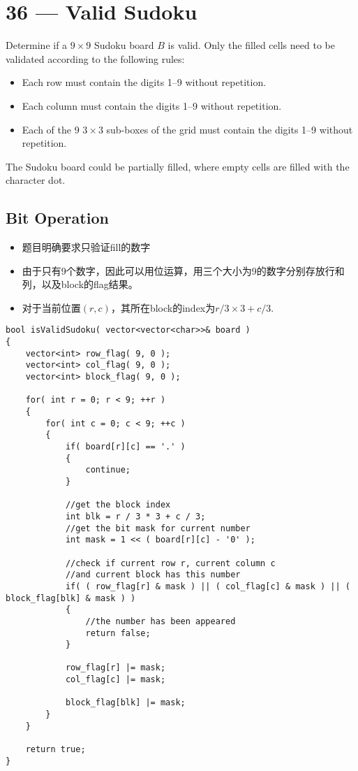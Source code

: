 \section{36 --- Valid Sudoku}
Determine if a $9\times 9$ Sudoku board $B$ is valid. Only the filled cells need to be validated according to the following rules:

\begin{itemize}
\item Each row must contain the digits 1--9 without repetition.
\item Each column must contain the digits 1--9 without repetition.
\item Each of the 9 $3\times 3$ sub-boxes of the grid must contain the digits 1--9 without repetition.
\end{itemize}

The Sudoku board could be partially filled, where empty cells are filled with the character dot.

\subsection{Bit Operation}
\begin{itemize}
\item 题目明确要求只验证fill的数字
\item 由于只有9个数字，因此可以用位运算，用三个大小为9的数字分别存放行和列，以及block的flag结果。
\item 对于当前位置$(r,c)$，其所在block的index为$r/3\times 3+c/3$.
\end{itemize}

\setcounter{lstlisting}{0}
\begin{lstlisting}[style=customc, caption={Bit Operation}]
bool isValidSudoku( vector<vector<char>>& board )
{
    vector<int> row_flag( 9, 0 );
    vector<int> col_flag( 9, 0 );
    vector<int> block_flag( 9, 0 );

    for( int r = 0; r < 9; ++r )
    {
        for( int c = 0; c < 9; ++c )
        {
            if( board[r][c] == '.' )
            {
                continue;
            }

            //get the block index
            int blk = r / 3 * 3 + c / 3;
            //get the bit mask for current number
            int mask = 1 << ( board[r][c] - '0' );

            //check if current row r, current column c
            //and current block has this number
            if( ( row_flag[r] & mask ) || ( col_flag[c] & mask ) || ( block_flag[blk] & mask ) )
            {
                //the number has been appeared
                return false;
            }

            row_flag[r] |= mask;
            col_flag[c] |= mask;

            block_flag[blk] |= mask;
        }
    }

    return true;
}
\end{lstlisting}